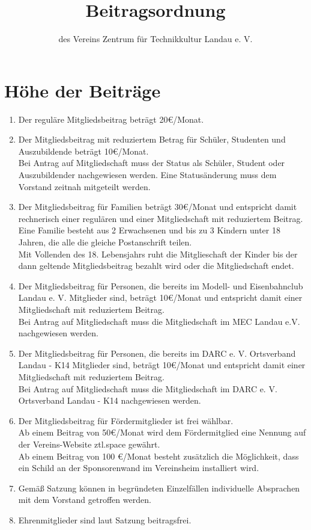 \documentclass[a4paper, 12pt]{scrartcl}
\begin{document}
\title{Beitragsordnung}
\subtitle{des Vereins Zentrum für Technikkultur Landau e. V.}
\author{}
\date{}

\maketitle

\section{Höhe der Beiträge}
\begin{enumerate}
	\item Der reguläre Mitgliedsbeitrag beträgt 20\euro/Monat.
	\item Der Mitgliedsbeitrag mit reduziertem Betrag für Schüler, Studenten und Auszubildende beträgt 10\euro/Monat.\\ 
	Bei Antrag auf Mitgliedschaft muss der Status als Schüler, Student oder Auszubildender nachgewiesen werden.
	Eine Statusänderung muss dem Vorstand zeitnah mitgeteilt werden.
	\item Der Mitgliedsbeitrag für Familien beträgt 30\euro/Monat und entspricht damit rechnerisch einer regulären und einer Mitgliedschaft mit reduziertem Beitrag. \\ 
Eine Familie besteht aus 2 Erwachsenen und bis zu 3 Kindern unter 18 Jahren, die alle die gleiche Postanschrift teilen.\\
Mit Vollenden des 18. Lebensjahrs ruht die Mitglieschaft der Kinder bis der dann geltende Mitgliedsbeitrag bezahlt wird oder die Mitgliedschaft endet. 
	\item Der Mitgliedsbeitrag für Personen, die bereits im Modell- und Eisenbahnclub Landau e. V. Mitglieder sind, beträgt 10\euro/Monat und entspricht damit einer Mitgliedschaft mit reduziertem Beitrag.\\ Bei Antrag auf Mitgliedschaft muss die Mitgliedschaft im MEC Landau e.V. nachgewiesen werden.
	\item Der Mitgliedsbeitrag für Personen, die bereits im DARC e. V. Ortsverband Landau - K14 Mitglieder sind, beträgt 10\euro/Monat und entspricht damit einer Mitgliedschaft mit reduziertem Beitrag.\\ Bei Antrag auf Mitgliedschaft muss die Mitgliedschaft im DARC e. V. Ortsverband Landau - K14 nachgewiesen werden.
	\item Der Mitgliedsbeitrag für Fördermitglieder ist frei wählbar. \\
	Ab einem Beitrag von 50\euro/Monat wird dem Fördermitglied eine Nennung auf der Vereins-Website ztl.space gewährt. \\
	Ab einem Beitrag von 100 \euro/Monat besteht zusätzlich die Möglichkeit, dass ein Schild an der Sponsorenwand im Vereinsheim installiert wird.
	\item Gemäß Satzung können in begründeten Einzelfällen individuelle Absprachen mit dem Vorstand getroffen werden. 
	\item Ehrenmitglieder sind laut Satzung beitragsfrei.
\end{enumerate}
\end{document}
